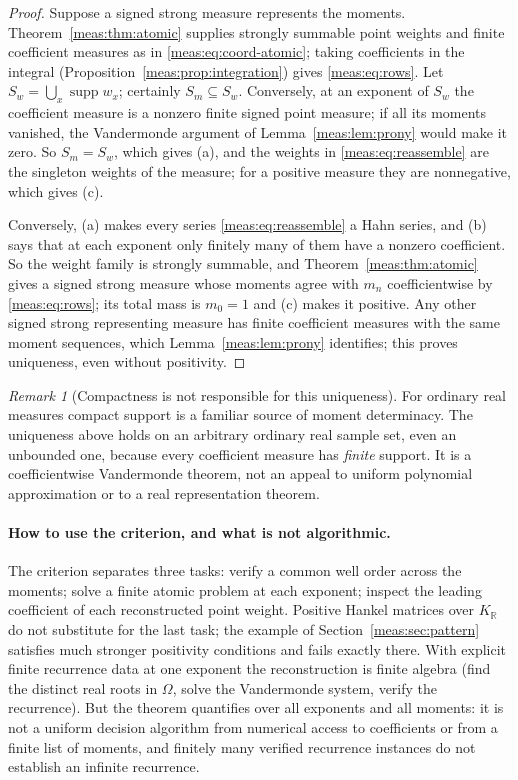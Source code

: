 \documentclass[11pt]{article}
\numberwithin{equation}{section}
\theoremstyle{definition}
\theoremstyle{remark}
\newtheorem{remark}[theorem]{Remark}
\newcommand{\R}{\mathbb R}
\newcommand{\KR}{K_{\R}}
\newcommand{\supp}{\operatorname{supp}}
\begin{document}
\begin{proof}
Suppose a signed strong measure represents the moments.
Theorem~\ref{meas:thm:atomic} supplies strongly summable point weights and finite
coefficient measures as in \eqref{meas:eq:coord-atomic}; taking coefficients in
the integral (Proposition~\ref{meas:prop:integration}) gives \eqref{meas:eq:rows}.
Let $S_w=\bigcup_x\supp w_x$; certainly $S_m\subseteq S_w$. Conversely, at an
exponent of $S_w$ the coefficient measure is a nonzero finite signed point
measure; if all its moments vanished, the Vandermonde argument of
Lemma~\ref{meas:lem:prony} would make it zero. So $S_m=S_w$, which gives (a),
and the weights in \eqref{meas:eq:reassemble} are the singleton weights of the
measure; for a positive measure they are nonnegative, which gives (c).

Conversely, (a) makes every series \eqref{meas:eq:reassemble} a Hahn series,
and (b) says that at each exponent only finitely many of them have a nonzero
coefficient. So the weight family is strongly summable, and
Theorem~\ref{meas:thm:atomic} gives a signed strong measure whose moments agree
with $m_n$ coefficientwise by \eqref{meas:eq:rows}; its total mass is $m_0=1$ and
(c) makes it positive. Any other signed strong representing measure has finite
coefficient measures with the same moment sequences, which
Lemma~\ref{meas:lem:prony} identifies; this proves uniqueness, even without
positivity.
\end{proof}

\begin{remark}[Compactness is not responsible for this uniqueness]
For ordinary real measures compact support is a familiar source of moment
determinacy. The uniqueness above holds on an arbitrary ordinary real sample
set, even an unbounded one, because every coefficient measure has \emph{finite}
support. It is a coefficientwise Vandermonde theorem, not an appeal to uniform
polynomial approximation or to a real representation theorem.
\end{remark}

\paragraph{How to use the criterion, and what is not algorithmic.} The
criterion separates three tasks: verify a common well order across the
moments; solve a finite atomic problem at each exponent; inspect the leading
coefficient of each reconstructed point weight. Positive Hankel matrices over
$\KR$ do not substitute for the last task; the example of
Section~\ref{meas:sec:pattern} satisfies much stronger positivity conditions and
fails exactly there. With explicit finite recurrence data at one exponent the
reconstruction is finite algebra (find the distinct real roots in $\Omega$,
solve the Vandermonde system, verify the recurrence). But the theorem quantifies
over all exponents and all moments: it is not a uniform decision algorithm
from numerical access to coefficients or from a finite list of moments, and
finitely many verified recurrence instances do not establish an infinite
recurrence.
\end{document}
